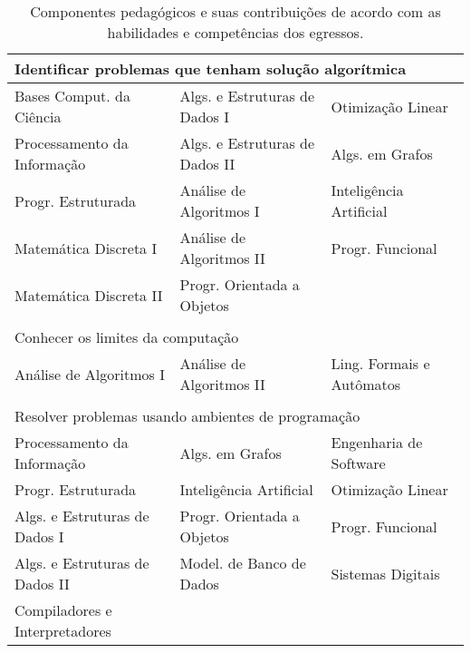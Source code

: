 \begin{longtable}{|p{}p{}p{}|}
    \caption{Componentes pedagógicos e suas contribuições de acordo com as habilidades e competências dos egressos.}
    \label{tab:mapeamento_competencias}
    \endfirsthead
    \endhead

    \multicolumn{3}{p{0.95\textwidth}}{Identificar problemas que tenham solução algorítmica}\\
    \hline
    \textcolor{nred}{Bases Comput. da Ciência}  &
    \textcolor{nblue}{Algs. e Estruturas de Dados I} &
    \textcolor{nblue}{Otimização Linear} \\
    \textcolor{nred}{Processamento da Informação} &
    \textcolor{nblue}{Algs. e Estruturas de Dados II} &
    \textcolor{nblue}{Algs. em Grafos} \\
    \textcolor{nblue}{Progr. Estruturada} &
    \textcolor{nblue}{Análise de Algoritmos I} &
    \textcolor{nblue}{Inteligência Artificial} \\
    \textcolor{nblue}{Matemática Discreta I} &
    \textcolor{nblue}{Análise de Algoritmos II} &
    \textcolor{nblue}{Progr. Funcional} \\
    \textcolor{nblue}{Matemática Discreta II} &
    \textcolor{nblue}{Progr. Orientada a Objetos} & \\

    \hline
    \multicolumn{3}{p{0.95\textwidth}}{}\\
    
    \multicolumn{3}{p{0.95\textwidth}}{Conhecer os limites da computação}\\
    \hline
    \textcolor{nblue}{Análise de Algoritmos I} &
    \textcolor{nblue}{Análise de Algoritmos II} &
    \textcolor{nblue}{Ling. Formais e Autômatos} \\

    \hline
    \multicolumn{3}{p{0.95\textwidth}}{}\\

    \multicolumn{3}{p{0.95\textwidth}}{Resolver problemas usando ambientes de programação}\\
    \hline
    \textcolor{nred}{Processamento da Informação} &
    \textcolor{nblue}{Algs. em Grafos} &
    \textcolor{nblue}{Engenharia de Software} \\
    \textcolor{nblue}{Progr. Estruturada} &
    \textcolor{nblue}{Inteligência Artificial} &
    \textcolor{nblue}{Otimização Linear}\\
    \textcolor{nblue}{Algs. e Estruturas de Dados I} &
    \textcolor{nblue}{Progr. Orientada a Objetos} &
    \textcolor{nblue}{Progr. Funcional}\\
    \textcolor{nblue}{Algs. e Estruturas de Dados II} &
    \textcolor{nblue}{\small Model. de Banco de Dados} &
    \textcolor{nblue}{Sistemas Digitais}\\
    \textcolor{nblue}{Compiladores e Interpretadores} & & \\
    \hline
    

\end{longtable}

